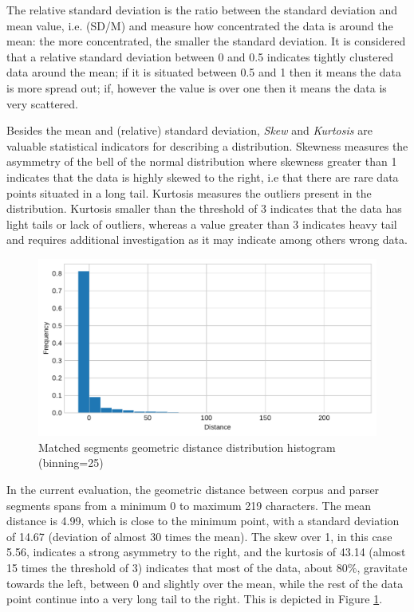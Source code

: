     The relative standard deviation is the ratio between the standard deviation and mean value, i.e. (SD/M) and measure how concentrated the data is around the mean: the more concentrated, the smaller the standard deviation. It is considered that a relative standard deviation between 0 and 0.5 indicates tightly clustered data around the mean; if it is situated between 0.5 and 1 then it means the data is more spread out; if, however the value is over one then it means the data is very scattered. 
    
    Besides the mean and (relative) standard deviation, \textit{Skew} and \textit{Kurtosis} are valuable statistical indicators for describing a distribution. Skewness measures the asymmetry of the bell of the normal distribution where skewness greater than 1 indicates that the data is highly skewed to the right, i.e that there are rare data points situated in a long tail. Kurtosis measures the outliers present in the distribution. Kurtosis smaller than the threshold of 3 indicates that the data has light tails or lack of outliers, whereas a value greater than 3 indicates heavy tail and requires additional investigation as it may indicate among others wrong data. 

    \begin{figure}[!ht]
    \centering
    \includegraphics[width=.85\textwidth]{evaluation-results/figures/distance-distribution-histogram-Geometric-25.pdf}
    \caption{Matched segments geometric distance distribution histogram (binning=25)}
    \label{fig:distance-distribution-histogram-Geometric-25}
    \end{figure}

    In the current evaluation, the geometric distance between corpus and parser segments spans from a minimum 0 to maximum 219 characters. The mean distance is 4.99, which is close to the minimum point, with a standard deviation of 14.67 (deviation of almost 30 times the mean). The skew over 1, in this case 5.56, indicates a strong asymmetry to the right, and the kurtosis of 43.14 (almost 15 times the threshold of 3) indicates that most of the data, about 80\%, gravitate towards the left, between 0 and slightly over the mean, while the rest of the data point continue into a very long tail to the right. This is depicted in Figure \ref{fig:distance-distribution-histogram-Geometric-25}. 
    
